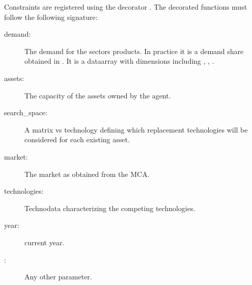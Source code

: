 \documentclass[letterpaper,10pt,english]{sphinxmanual}
\begin{document}
Constraints are registered using the decorator
. The decorated functions must follow
the following signature:

\begin{sphinxVerbatim}[commandchars=\\\{\}]
 
     
     
     
     
     
     \PYG{p}{[}\PYG{p}{]}  
  
\end{sphinxVerbatim}
\begin{description}
\item[{demand:}] \leavevmode
The demand for the sectors products. In practice it is a demand share obtained in
. It is a data\sphinxhyphen{}array with dimensions including ,
, .

\item[{assets:}] \leavevmode
The capacity of the assets owned by the agent.

\item[{search\_space:}] \leavevmode
A matrix  vs  technology defining which replacement technologies
will be considered for each existing asset.

\item[{market:}] \leavevmode
The market as obtained from the MCA.

\item[{technologies:}] \leavevmode
Technodata characterizing the competing technologies.

\item[{year:}] \leavevmode
current year.

\item[{:}] \leavevmode
Any other parameter.

\end{description}
\end{document}
